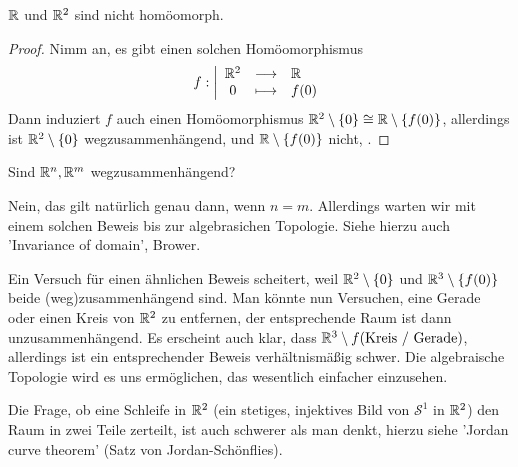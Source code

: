 \begin{corollary}\label{cor:R-und-R2-sind-nicht-homöomorph}
    $\mathbb{R}$ und $\mathbb{R}^2$ sind nicht homöomorph.
\end{corollary}
\begin{proof}
    Nimm an, es gibt einen solchen Homöomorphismus
        \begin{equation*}
        f: \left| \begin{array}{c c l} 
        \mathbb{R}^2 & \longrightarrow & \mathbb{R} \\
        0 & \longmapsto &  f(0)
        \end{array} \right.
    \end{equation*}
    Dann induziert $f$ auch einen Homöomorphismus $\mathbb{R}^2 \setminus \left \{0\right\} \cong \mathbb{R} \setminus \left \{f(0)\right\} $, allerdings ist $\mathbb{R}^2 \setminus \left \{0\right\} $ wegzusammenhängend, und $\mathbb{R} \setminus \left \{f(0)\right\} $ nicht, \contra.
\end{proof}

\begin{question}
    Sind $\mathbb{R}^n, \mathbb{R}^m$ wegzusammenhängend?
\end{question}

\begin{answer}
    Nein, das gilt natürlich genau dann, wenn $n = m$. Allerdings warten wir mit einem solchen Beweis bis zur algebrasichen Topologie. Siehe hierzu auch 'Invariance of domain', Brower.
\end{answer}
Ein Versuch für einen ähnlichen Beweis scheitert, weil $\mathbb{R}^2 \setminus \left \{0\right\}$ und $\mathbb{R}^3 \setminus \left \{f(0)\right\} $ beide (weg)zusammenhängend sind. Man könnte nun Versuchen, eine Gerade oder einen Kreis von $\mathbb{R}^2$ zu entfernen, der entsprechende Raum ist dann unzusammenhängend. Es erscheint auch klar, dass $\mathbb{R}^3 \setminus f(\text{Kreis / Gerade})$, allerdings ist ein entsprechender Beweis verhältnismäßig schwer. Die algebraische Topologie wird es uns ermöglichen, das wesentlich einfacher einzusehen.

\begin{remark*}
    Die Frage, ob eine Schleife in $\mathbb{R}^2$ (ein stetiges, injektives Bild von $\mathcal{S}^1$ in $\mathbb{R}^2$) den Raum in zwei Teile zerteilt, ist auch schwerer als man denkt, hierzu siehe 'Jordan curve theorem' (Satz von Jordan-Schönflies).
\end{remark*}

\begin{comment} %
Zur Motivation der Definition für den Zusammenhang: Man sollte über Zusammenhang eher wie in der Graphentheorie nachdenken.
Das Königsberger Brückenproblem ist gewissermaßen ein 'Urproblem der Topologie'.
\end{comment}

